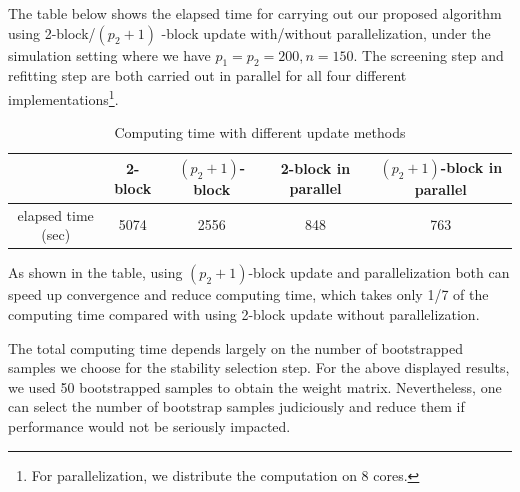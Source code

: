 \medskip
The table below shows the elapsed time for carrying out our proposed algorithm using 2-block/$(p_2+1)$ -block update with/without parallelization, under the simulation setting where we have $p_1=p_2=200,n=150$. The screening step and refitting step are both carried out in parallel for all four different implementations\footnote{For parallelization, we distribute the computation on 8 cores.}. 
\begin{table}[H]
\centering
\caption{Computing time with different update methods}
\begin{tabular}{c|cccc}
\hline
	& 2-block & $(p_2+1)$-block & 2-block in parallel & $(p_2+1)$-block in parallel \\
\hline
elapsed time (sec) & 5074 & 2556 & 848 & 763 \\
\hline 
\end{tabular}
\end{table}

As shown in the table, using $(p_2+1)$-block update and parallelization both can speed up convergence and reduce computing time, which takes only 1/7 of the computing time compared with using 2-block update without parallelization.

\begin{remark}
The total computing time depends largely on the number of bootstrapped samples we choose for the stability selection step. For the above displayed results, we used 50 bootstrapped samples to obtain the weight matrix. Nevertheless, one can select the number of bootstrap samples judiciously and reduce them if performance would  not be seriously impacted.
\end{remark}












